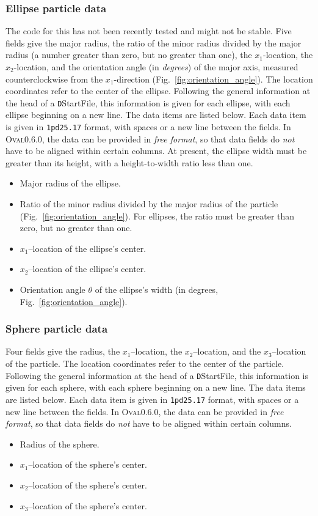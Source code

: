 \documentclass[letterpaper,11pt]{article}
\newcommand{\Oval}{\textsc{Oval}}
\begin{document}
\subsubsection{Ellipse particle data}\label{sec:ellipse_data}
The code for this has not been recently tested
and might not be stable.
Five fields give the major radius, the ratio of the minor radius
divided by the major radius (a number greater than zero, but
no greater than one),
the $x_{1}$-location, the $x_{2}$-location, and the orientation
angle (in \emph{degrees}) of the major axis, measured counterclockwise
from the $x_{1}$-direction (Fig.~\ref{fig:orientation_angle}).
The location coordinates refer to the center of the ellipse.
Following the general information at the head of a
\texttt{D}\textsf{StartFile}, this
information is given for each ellipse,
with each ellipse beginning on a new line.
The data items are listed below.
Each data item is given in \texttt{1pd25.17} format, with
spaces or a new line between the fields.
In \Oval0.6.0, the data can be provided in \emph{free format},
so that data fields do \emph{not} have to be aligned
within certain columns.
At present, the ellipse width must be greater than its height, with
a height-to-width ratio less than one.
\begin{itemize}
\item
Major radius of the ellipse.
\item
Ratio of the minor radius divided by the major radius of the particle
(Fig.~\ref{fig:orientation_angle}).
For ellipses, the ratio must be greater than zero, but no greater than one.
\item
$x_{1}$--location of the ellipse's center.
\item
$x_{2}$--location of the ellipse's center.
\item
Orientation angle $\theta$ of the ellipse's width (in degrees, Fig.~\ref{fig:orientation_angle}).
\end{itemize}
%
\subsubsection{Sphere particle data}\label{sec:sphere_data}
Four fields give the radius,
the $x_{1}$--location, the $x_{2}$--location, and the $x_{3}$--location 
of the particle.
The location coordinates refer to the center of the particle.
Following the general information at the head of a
\texttt{D}\textsf{StartFile}, this
information is given for each sphere,
with each sphere beginning on a new line.
The data items are listed below.
Each data item is given in \texttt{1pd25.17} format, with
spaces or a new line between the fields.
In \Oval0.6.0, the data can be provided in \emph{free format},
so that data fields do \emph{not} have to be aligned
within certain columns.
\begin{itemize}
\item
Radius of the sphere.
\item
$x_{1}$--location of the sphere's center.
\item
$x_{2}$--location of the sphere's center.
\item
$x_{3}$--location of the sphere's center.
\end{itemize}
%
\end{document}
